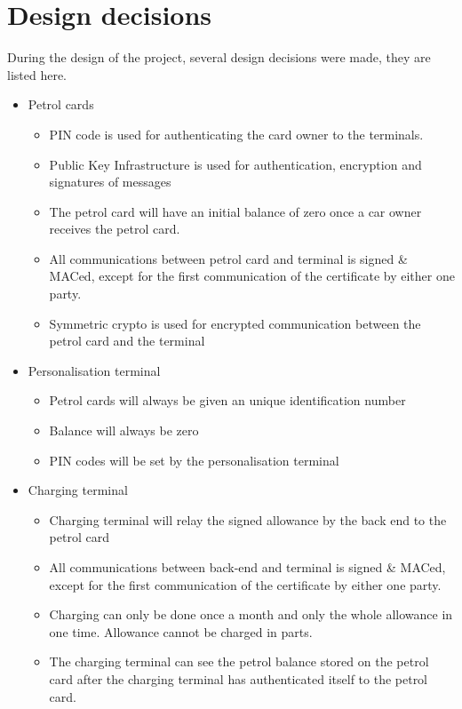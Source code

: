 \section{Design decisions}
During the design of the project, several design decisions were made, they are listed here.
\begin{itemize}
\item Petrol cards
\begin{itemize}
\item PIN code is used for authenticating the card owner to the terminals.
\item Public Key Infrastructure is used for authentication, encryption and signatures of messages
\item The petrol card will have an initial balance of zero once a car owner receives the petrol card. 
\item All communications between petrol card and terminal is signed \& MACed, except for the first communication of the certificate by either one party.
\item Symmetric crypto is used for encrypted communication between the petrol card and the terminal
\end{itemize}

\item Personalisation terminal
\begin{itemize}
\item Petrol cards will always be given an unique identification number
\item Balance will always be zero 
\item PIN codes will be set by the personalisation terminal
\end{itemize}

\item Charging terminal
\begin{itemize}
\item Charging terminal will relay the signed allowance by the back end to the petrol card 
\item All communications between back-end and terminal is signed \& MACed, except for the first communication of the certificate by either one party.
\item Charging can only be done once a month and only the whole allowance in one time. Allowance cannot be charged in parts.
\item The charging terminal can see the petrol balance stored on the petrol card after the charging terminal has authenticated itself to the petrol card.
\end{itemize}


\end{itemize}
